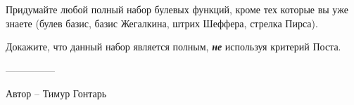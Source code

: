 \question
Придумайте любой полный набор булевых функций, кроме тех которые вы уже знаете (булев базис, базис Жегалкина, штрих Шеффера, стрелка Пирса).

Докажите, что данный набор является полным, \textbf{\textit{не}} используя критерий Поста.

---------------

Автор -- Тимур Гонтарь